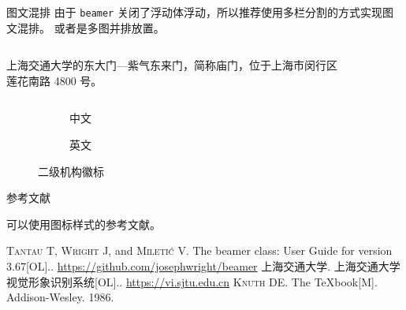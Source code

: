 \documentclass{ctexbeamer}
\begin{document}
\begin{frame}[fragile]
\begin{columns}[T]
\begin{column}{.45\textwidth}
      \begin{stampblock}{图文混排}
        由于 \texttt{beamer} 关闭了浮动体浮动，所以推荐使用多栏分割的方式实现图文混排。
        或者是多图并排放置。
        \begin{columns}
          \begin{column}{0.7\textwidth}
            上海交通大学的东大门---紫气东来门，简称庙门，位于上海市闵行区莲花南路 4800 号。
          \end{column}
          \begin{column}{0.3\textwidth}
            \begin{figure}
            \end{figure}
          \end{column}
        \end{columns}
        \begin{figure}
          \begin{subfigure}{0.4\textwidth}
            \caption{中文}
          \end{subfigure}\hspace*{20pt}
          \begin{subfigure}{0.4\textwidth}
            \caption{英文}
          \end{subfigure}
          \caption{二级机构徽标}
        \end{figure}
      \end{stampblock}

      \begin{stampblock}{参考文献}

        可以使用图标样式的参考文献。

        \begin{bibliolist}{00}
          \onlineitem \textsc{Tantau T}, \textsc{Wright J}, and
          \textsc{Mileti\'c V}.\newblock
          The beamer class: User Guide for version 3.67[OL].. \url{https://github.com/josephwright/beamer}
          \articleitem \textsc{上海交通大学}.\newblock
          上海交通大学视觉形象识别系统[OL].. \url{https://vi.sjtu.edu.cn}
          \bookitem \textsc{Knuth DE}.\newblock
          The \TeX{}book[M].\newblock
          Addison-Wesley. 1986.
        \end{bibliolist}


\end{stampblock}
\end{column}
\end{columns}
\end{frame}
\end{document}
